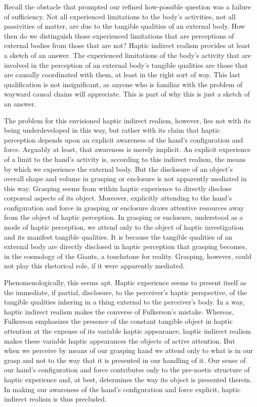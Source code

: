 \documentclass[12pt]{article}
\begin{document}
Recall the obstacle that prompted our refined how-possible question was a failure of sufficiency. Not all experienced limitations to the body's activities, not all passivities of matter, are due to the tangible qualities of an external body. How then do we distinguish those experienced limitations that are perceptions of external bodies from those that are not? Haptic indirect realism provides at least a sketch of an answer. The experienced limitations of the body's activity that are involved in the perception of an external body's tangible qualities are those that are causally coordinated with them, at least in the right sort of way. This last qualification is not insignificant, as anyone who is familiar with the problem of wayward causal chains will appreciate. This is part of why this is just a sketch of an answer. 

The problem for this envisioned haptic indirect realism, however, lies not with its being underdeveloped in this way, but rather with its claim that haptic perception depends upon an explicit awareness of the hand's configuration and force. Arguably at least, that awareness is merely implicit. An explicit experience of a limit to the hand's activity is, according to this indirect realism, the means by which we experience the external body. But the disclosure of an object's overall shape and volume in grasping or enclosure is not apparently mediated in this way. Grasping seems from within haptic experience to directly disclose corporeal aspects of its object. Moreover, explicitly attending to the hand's configuration and force in grasping or enclosure draws attentive resources away from the object of haptic perception. In grasping or enclosure, understood as a mode of haptic perception, we attend only to the object of haptic investigation and its manifest tangible qualities. It is because the tangible qualities of an external body are directly disclosed in haptic perception that grasping becomes, in the cosmology of the Giants, a touchstone for reality. Grasping, however, could not play this rhetorical role, if it were apparently mediated.

Phenomenologically, this seems apt. Haptic experience seems to present itself as the immediate, if partial, disclosure, to the perceiver's haptic perspective, of the tangible qualities inhering in a thing external to the perceiver's body. In a way, haptic indirect realism makes the converse of Fulkerson's mistake. Whereas, Fulkerson emphasizes the presence of the constant tangible object in haptic attention at the expense of its variable haptic appearance, haptic indirect realism makes these variable haptic appearances the objects of active attention. But when we perceive by means of our grasping hand we attend only to what is in our grasp and not to the way that it is presented in our handling of it. Our sense of our hand's configuration and force contributes only to the pre-noetic structure of haptic experience and, at best, determines the way its object is presented therein. In making our awareness of the hand's configuration and force explicit, haptic indirect realism is thus precluded. 
\end{document}
